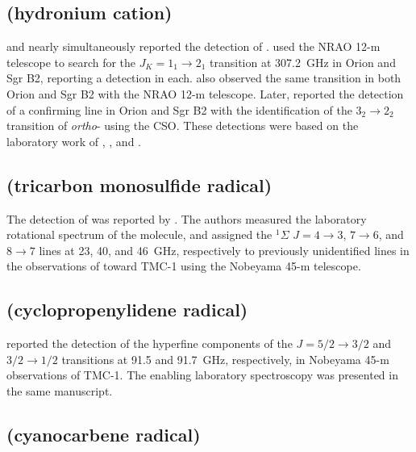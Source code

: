 \documentclass[twocolumn]{aastex631}
\begin{document}
	\subsection{ (hydronium cation)}
	\label{H3O+}
	
	\citet{Wootten:1986tg} and \citet{Hollis:1986fs} nearly simultaneously reported the detection of .  \citet{Wootten:1986tg} used the NRAO 12-m telescope to search for the $J_K = 1_1\rightarrow2_1$ transition at 307.2~GHz in Orion and Sgr B2, reporting a detection in each.  \citet{Hollis:1986fs} also observed the same transition in both Orion and Sgr B2 with the NRAO 12-m telescope.  Later, \citet{Wootten:1991js} reported the detection of a confirming line in Orion and Sgr B2 with the identification of the $3_2\rightarrow2_2$ transition of \emph{ortho}- using the CSO.   These detections were based on the laboratory work of \citet{Plummer:1985im}, \citet{Bogey:1985hy}, and \citet{Liu:1985gf}. 
	
	\subsection{ (tricarbon monosulfide radical)}
	\label{C3S}
	
	The detection of  was reported by \citet{Yamamoto:1987jd}.  The authors measured the laboratory rotational spectrum of the molecule, and assigned the $^1\Sigma$ $J = 4\rightarrow3$, $7\rightarrow6$, and $8\rightarrow7$ lines at 23, 40, and 46~GHz, respectively to previously unidentified lines in the observations of \citet{Kaifu:1987cf} toward TMC-1 using the Nobeyama 45-m telescope.
	
	\subsection{ (cyclopropenylidene radical)}
	\label{c-C3H}
	
	\citet{Yamamoto:1987we} reported the detection of the hyperfine components of the $J = 5/2\rightarrow3/2$ and $3/2\rightarrow1/2$ transitions at 91.5 and 91.7~GHz, respectively, in Nobeyama 45-m observations of TMC-1.  The enabling laboratory spectroscopy was presented in the same manuscript.
	
	\subsection{ (cyanocarbene radical)}
	\label{HC2N}
	
\end{document}
